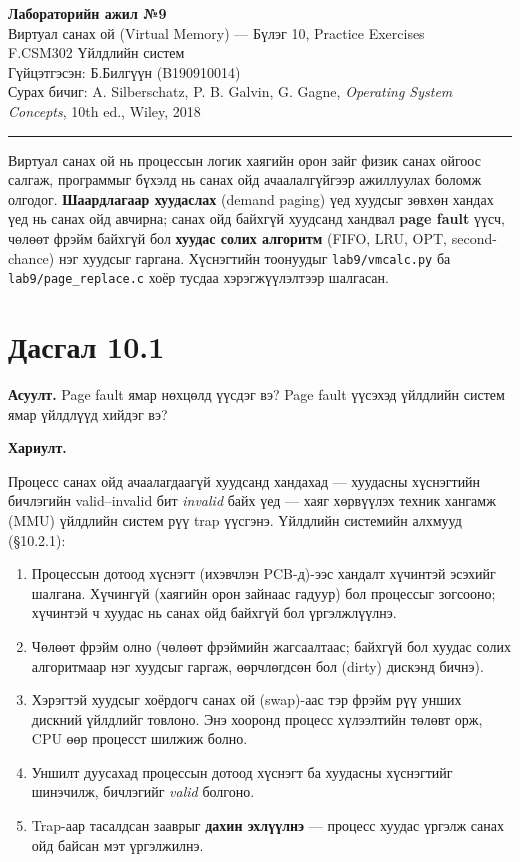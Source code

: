 \documentclass[12pt,a4paper]{article}
\newcommand{\question}[2]{\section{Дасгал #1}\textbf{Асуулт.} #2\par\medskip\textbf{Хариулт.}\par}
\begin{document}
\begin{center}
  {\Large\bfseries Лабораторийн ажил №9}\\[0.4em]
  {\large Виртуал санах ой (Virtual Memory) — Бүлэг 10, Practice Exercises}\\[0.8em]
  F.CSM302 Үйлдлийн систем\\
  Гүйцэтгэсэн: Б.Билгүүн (B190910014)\\[0.3em]
  Сурах бичиг: A. Silberschatz, P. B. Galvin, G. Gagne, \textit{Operating System Concepts}, 10th ed., Wiley, 2018
\end{center}
\hrule
\bigskip

Виртуал санах ой нь процессын логик хаягийн орон зайг физик санах ойгоос салгаж, программыг бүхэлд нь санах ойд ачаалалгүйгээр ажиллуулах боломж олгодог. \textbf{Шаардлагаар хуудаслах} (demand paging) үед хуудсыг зөвхөн хандах үед нь санах ойд авчирна; санах ойд байхгүй хуудсанд хандвал \textbf{page fault} үүсч, чөлөөт фрэйм байхгүй бол \textbf{хуудас солих алгоритм} (FIFO, LRU, OPT, second-chance) нэг хуудсыг гаргана. Хүснэгтийн тоонуудыг \texttt{lab9/vmcalc.py} ба \texttt{lab9/page\_replace.c} хоёр тусдаа хэрэгжүүлэлтээр шалгасан.

\question{10.1}{Page fault ямар нөхцөлд үүсдэг вэ? Page fault үүсэхэд үйлдлийн систем ямар үйлдлүүд хийдэг вэ?}

Процесс санах ойд ачаалагдаагүй хуудсанд хандахад — хуудасны хүснэгтийн бичлэгийн valid–invalid бит \emph{invalid} байх үед — хаяг хөрвүүлэх техник хангамж (MMU) үйлдлийн систем рүү trap үүсгэнэ. Үйлдлийн системийн алхмууд (§10.2.1):
\begin{enumerate}[leftmargin=1.5em]
  \item Процессын дотоод хүснэгт (ихэвчлэн PCB-д)-ээс хандалт хүчинтэй эсэхийг шалгана. Хүчингүй (хаягийн орон зайнаас гадуур) бол процессыг зогсооно; хүчинтэй ч хуудас нь санах ойд байхгүй бол үргэлжлүүлнэ.
  \item Чөлөөт фрэйм олно (чөлөөт фрэймийн жагсаалтаас; байхгүй бол хуудас солих алгоритмаар нэг хуудсыг гаргаж, өөрчлөгдсөн бол (dirty) дискэнд бичнэ).
  \item Хэрэгтэй хуудсыг хоёрдогч санах ой (swap)-аас тэр фрэйм рүү унших дискний үйлдлийг товлоно. Энэ хооронд процесс хүлээлтийн төлөвт орж, CPU өөр процесст шилжиж болно.
  \item Уншилт дуусахад процессын дотоод хүснэгт ба хуудасны хүснэгтийг шинэчилж, бичлэгийг \emph{valid} болгоно.
  \item Trap-аар тасалдсан зааврыг \textbf{дахин эхлүүлнэ} — процесс хуудас үргэлж санах ойд байсан мэт үргэлжилнэ.
\end{enumerate}
\end{document}
